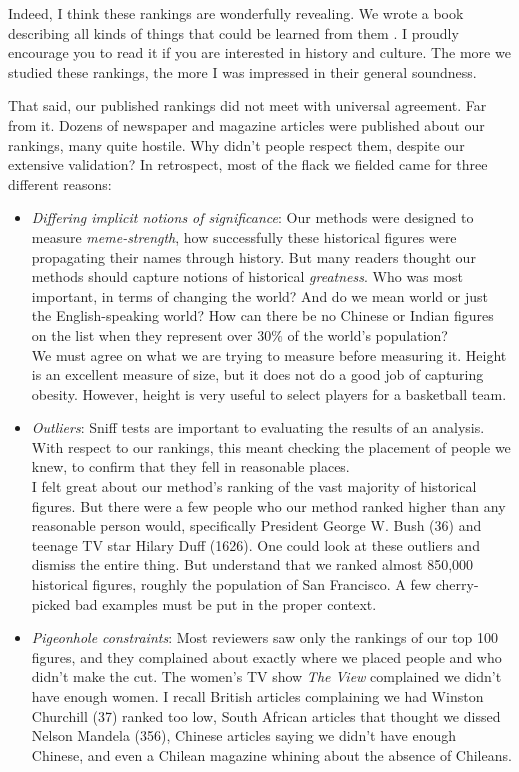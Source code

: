\documentclass[10pt]{article}
\begin{document}
Indeed, I think these rankings are wonderfully revealing. We wrote a book describing all kinds of things that could be learned from them \cite{SW13}. I proudly encourage you to read it if you are interested in history and culture. The more we studied these rankings, the more I was impressed in their general soundness.

That said, our published rankings did not meet with universal agreement. Far from it. Dozens of newspaper and magazine articles were published about our rankings, many quite hostile. Why didn't people respect them, despite our extensive validation? In retrospect, most of the flack we fielded came for three different reasons:

\begin{itemize}
  \item \emph{Differing implicit notions of significance}: Our methods were designed to measure \emph{meme-strength}, how successfully these historical figures were propagating their names through history. But many readers thought our methods should capture notions of historical \emph{greatness}. Who was most important, in terms of changing the world? And do we mean world or just the English-speaking world? How can there be no Chinese or Indian figures on the list when they represent over $30\%$ of the world's population?\\
We must agree on what we are trying to measure before measuring it. Height is an excellent measure of size, but it does not do a good job of capturing obesity. However, height is very useful to select players for a basketball team.
  \item \emph{Outliers}: Sniff tests are important to evaluating the results of an analysis. With respect to our rankings, this meant checking the placement of people we knew, to confirm that they fell in reasonable places.\\
I felt great about our method's ranking of the vast majority of historical figures. But there were a few people who our method ranked higher than any reasonable person would, specifically President George W. Bush (36) and teenage TV star Hilary Duff (1626). One could look at these outliers and dismiss the entire thing. But understand that we ranked almost 850,000 historical figures, roughly the population of San Francisco. A few cherry-picked bad examples must be put in the proper context.
  \item \emph{Pigeonhole constraints}: Most reviewers saw only the rankings of our top 100 figures, and they complained about exactly where we placed people and who didn't make the cut. The women's TV show \emph{The View} complained we didn't have enough women. I recall British articles complaining we had Winston Churchill (37) ranked too low, South African articles that thought we dissed Nelson Mandela (356), Chinese articles saying we didn't have enough Chinese, and even a Chilean magazine whining about the absence of Chileans.\\

\end{itemize}
\end{document}
